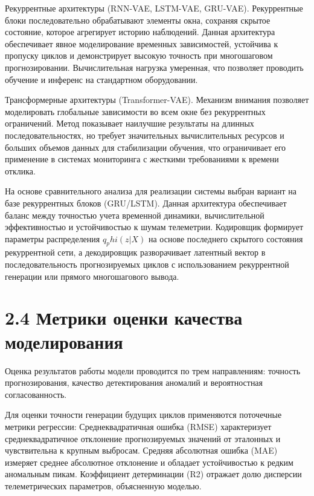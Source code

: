 \documentclass[14pt, a4paper, oneside]{extreport}
\begin{document}
Рекуррентные архитектуры (RNN-VAE, LSTM-VAE, GRU-VAE). Рекуррентные блоки последовательно обрабатывают элементы окна, сохраняя скрытое состояние, которое агрегирует историю наблюдений. Данная архитектура обеспечивает явное моделирование временных зависимостей, устойчива к пропуску циклов и демонстрирует высокую точность при многошаговом прогнозировании. Вычислительная нагрузка умеренная, что позволяет проводить обучение и инференс на стандартном оборудовании.

Трансформерные архитектуры (Transformer-VAE). Механизм внимания позволяет моделировать глобальные зависимости во всем окне без рекуррентных ограничений. Метод показывает наилучшие результаты на длинных последовательностях, но требует значительных вычислительных ресурсов и больших объемов данных для стабилизации обучения, что ограничивает его применение в системах мониторинга с жесткими требованиями к времени отклика.

На основе сравнительного анализа для реализации системы выбран вариант на базе рекуррентных блоков (GRU/LSTM). Данная архитектура обеспечивает баланс между точностью учета временной динамики, вычислительной эффективностью и устойчивостью к шумам телеметрии. Кодировщик формирует параметры распределения $q_phi(z|X)$ на основе последнего скрытого состояния рекуррентной сети, а декодировщик разворачивает латентный вектор в последовательность прогнозируемых циклов с использованием рекуррентной генерации или прямого многошагового вывода.


\vspace{1em}
\section{2.4 Метрики оценки качества моделирования}
\vspace{1em}

Оценка результатов работы модели проводится по трем направлениям: точность прогнозирования, качество детектирования аномалий и вероятностная согласованность.

Для оценки точности генерации будущих циклов применяются поточечные метрики регрессии:
Среднеквадратичная ошибка (RMSE) характеризует среднеквадратичное отклонение прогнозируемых значений от эталонных и чувствительна к крупным выбросам.
Средняя абсолютная ошибка (MAE) измеряет среднее абсолютное отклонение и обладает устойчивостью к редким аномальным пикам.
Коэффициент детерминации (R2) отражает долю дисперсии телеметрических параметров, объясненную моделью.
\end{document}
